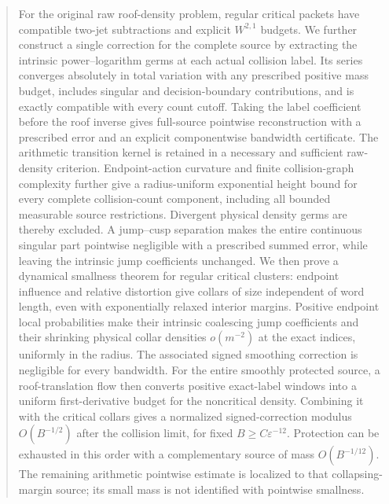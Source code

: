 \documentclass[11pt,reqno]{amsart}
\numberwithin{equation}{section}
\theoremstyle{definition}\newtheorem{definition}[theorem]{Definition}
\theoremstyle{remark}\newtheorem{remark}[theorem]{Remark}
\begin{document}
\begin{abstract}
For the original raw roof-density problem, regular critical packets
have compatible two-jet subtractions and explicit $W^{2,1}$ budgets.
We further construct a single correction for the complete source by
extracting the intrinsic power--logarithm germs at each actual collision
label. Its series converges absolutely in total variation with any
prescribed positive mass budget, includes singular and decision-boundary
contributions, and is exactly compatible with every count cutoff.
Taking the label coefficient before the roof inverse gives full-source
pointwise reconstruction with a prescribed error and an explicit
componentwise bandwidth certificate. The arithmetic transition kernel
is retained in a necessary and sufficient raw-density criterion.
Endpoint-action curvature and finite collision-graph complexity further
give a radius-uniform exponential height bound for every complete
collision-count component, including all bounded measurable source
restrictions. Divergent physical density germs are thereby excluded.
A jump--cusp separation makes the entire continuous singular part
pointwise negligible with a prescribed summed error, while leaving
the intrinsic jump coefficients unchanged. We then prove a dynamical
smallness theorem for regular critical clusters: endpoint influence and
relative distortion give collars of size independent of word length,
even with exponentially relaxed interior margins. Positive endpoint
local probabilities make their intrinsic coalescing jump coefficients
and their shrinking physical collar densities $o(m^{-2})$ at the exact
indices, uniformly in the radius. The associated signed smoothing
correction is negligible for every bandwidth. For the entire smoothly protected source, a roof-translation flow
then converts positive exact-label windows into a uniform first-derivative
budget for the noncritical density. Combining it with the critical
collars gives a normalized signed-correction modulus $O(B^{-1/2})$
after the collision limit, for fixed $B\ge C\varepsilon^{-12}$.
Protection can be exhausted in this order with a complementary source
of mass $O(B^{-1/12})$. The remaining arithmetic pointwise estimate is
localized to that collapsing-margin source; its small mass is not
identified with pointwise smallness.
\end{abstract}
\maketitle
\enlargethispage{3pt}
\end{document}
